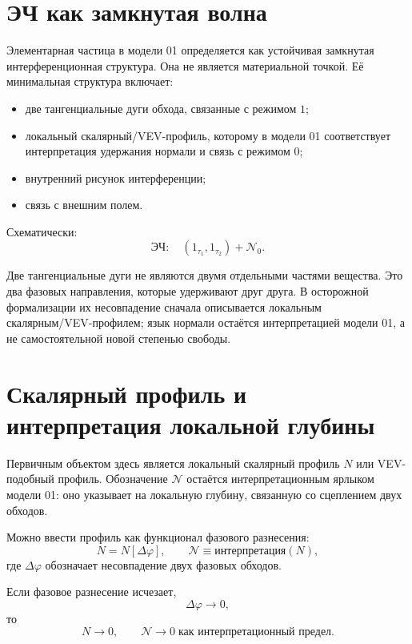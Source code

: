 \documentclass[11pt,a4paper]{article}
\newcommand{\phase}{\varphi}
\newcommand{\normal}{\mathcal{N}}
\begin{document}
\section{ЭЧ как замкнутая волна}

Элементарная частица в модели 01 определяется как устойчивая замкнутая интерференционная структура. Она не является материальной точкой. Её минимальная структура включает:
\begin{itemize}
\item две тангенциальные дуги обхода, связанные с режимом $1$;
\item локальный скалярный/VEV-профиль, которому в модели 01 соответствует интерпретация удержания нормали и связь с режимом $0$;
\item внутренний рисунок интерференции;
\item связь с внешним полем.
\end{itemize}

Схематически:
\begin{equation}
\text{ЭЧ}: \quad (1_{\tau_1},1_{\tau_2}) + \normal_0.
\end{equation}

Две тангенциальные дуги не являются двумя отдельными частями вещества. Это два фазовых направления, которые удерживают друг друга. В осторожной формализации их несовпадение сначала описывается локальным скалярным/VEV-профилем; язык нормали остаётся интерпретацией модели 01, а не самостоятельной новой степенью свободы.

\section{Скалярный профиль и интерпретация локальной глубины}

Первичным объектом здесь является локальный скалярный профиль $N$ или VEV-подобный профиль. Обозначение $\normal$ остаётся интерпретационным ярлыком модели 01: оно указывает на локальную глубину, связанную со сцеплением двух обходов.

Можно ввести профиль как функционал фазового разнесения:
\begin{equation}
N = N[\Delta\phase], \qquad \normal \equiv \text{интерпретация}(N),
\end{equation}
где $\Delta\phase$ обозначает несовпадение двух фазовых обходов.

Если фазовое разнесение исчезает,
\begin{equation}
\Delta\phase \to 0,
\end{equation}
то
\begin{equation}
N \to 0, \qquad \normal \to 0 \;\text{как интерпретационный предел}.
\end{equation}
\end{document}
